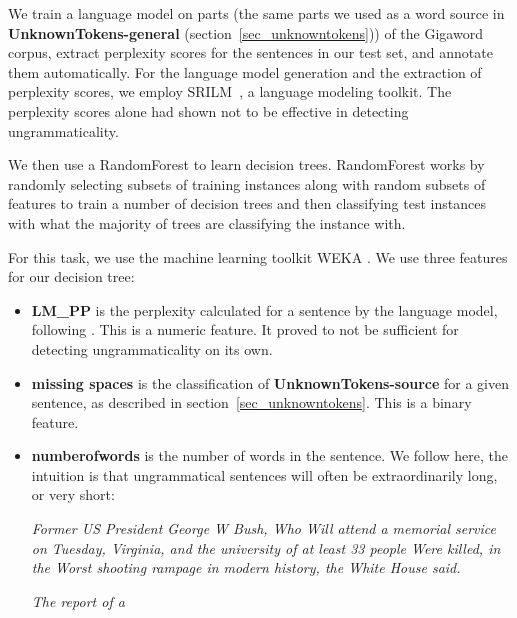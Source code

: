 \documentclass[a4paper,10pt]{scrartcl}
\theoremstyle{style}
\begin{document}
We train a language model on parts (the same parts we used as a word source in \textbf{UnknownTokens-general} (section~\ref{sec_unknowntokens})) of the Gigaword corpus\citep{gigaword}, extract perplexity scores for the sentences in our test set, and annotate them automatically. For the language model generation and the extraction of perplexity scores, we employ SRILM~\citep{stolcke2002srilm}, a language modeling toolkit. The perplexity scores alone had shown not to be effective in detecting ungrammaticality.


We then use a RandomForest \citep{breiman2001random} to learn decision trees.
RandomForest works by randomly selecting subsets of training instances along with random subsets of features to train a number of decision trees and then classifying test instances with what the majority of trees are classifying the instance with.

For this task, we use the machine learning toolkit WEKA \citep{hall2009weka}.
We use three features for our decision tree:

\begin{itemize}
	\item \textbf{LM\_PP} is the perplexity calculated for a sentence by the language model, following \cite{sun2007detecting}. This is a numeric feature. It proved to not be sufficient for detecting ungrammaticality on its own.
	\item \textbf{missing spaces} is the classification of \textbf{UnknownTokens-source} for a given sentence, as described in section~\ref{sec_unknowntokens}. This is a binary feature.
	\item \textbf{numberofwords} is the number of words in the sentence. We follow \cite{wagner2007comparative} here, the intuition is that ungrammatical sentences will often be extraordinarily long, or very short:

		\textit{Former US President George W Bush, Who Will attend a memorial service on Tuesday, Virginia, and the university of at least 33 people Were killed, in the Worst shooting rampage in modern history, the White House said.}

		\textit{The report of a}
\end{itemize}

\end{document}
